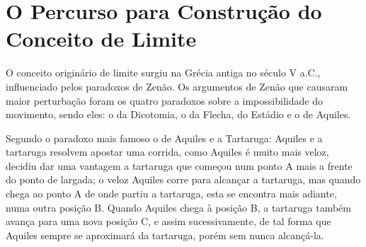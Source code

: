 \documentclass{article}
\newcommand{\R}{\mathbb{R}}
\begin{document}


%
%
%
%
%
%
%
%
%

%
\newpage
{}%
%
%
%
%


\newpage

%


\chapter{O Percurso para Construção do Conceito de Limite} \hspace{1.0cm}

O conceito originário de limite surgiu na Grécia antiga no século V a.C., influenciado pelos paradoxos de Zenão. Os argumentos de Zenão que causaram maior perturbação foram os quatro paradoxos sobre a impossibilidade do movimento, sendo eles: o da Dicotomia, o da Flecha, do Estádio e o de Aquiles.

\medskip
Segundo o paradoxo mais famoso o de Aquiles e a Tartaruga: Aquiles e a tartaruga resolvem apostar uma corrida, como Aquiles é muito mais veloz, decidiu dar uma vantagem a tartaruga que começou num ponto A mais a frente do ponto de largada; o veloz Aquiles corre para alcançar a tartaruga, mas quando chega ao ponto A de onde partiu a tartaruga, esta se encontra mais adiante, numa outra posição B. Quando Aquiles chega à posição B, a tartaruga também avança para uma nova posição C, e assim sucessivamente, de tal forma que Aquiles sempre se aproximará da tartaruga, porém sem nunca alcançá-la.
\end{document}
